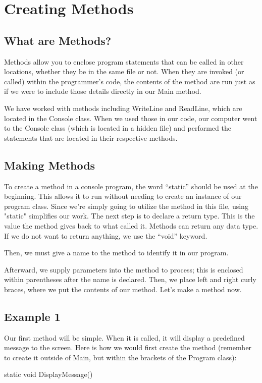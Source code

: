 \documentclass[oneside, openany] {book}
\begin{document}
\chapter{Creating Methods}
\minitoc
\section{What are Methods?}

Methods allow you to enclose program statements that can be called in other locations, whether they be in the same file or not. When they are invoked (or called) within the programmer’s code, the contents of the method are run just as if we were to include those details directly in our Main method.

We have worked with methods including WriteLine and ReadLine, which are located in the Console class. When we used those in our code, our computer went to the Console class (which is located in a hidden file) and performed the statements that are located in their respective methods.

\section{Making Methods}
To create a method in a console program, the word “static” should be used at the beginning. This allows it to run without needing to create an instance of our program class. Since we're simply going to utilize the method in this file, using "static" simplifies our work.
The next step is to declare a return type. This is the value the method gives back to what called it. Methods can return any data type. If we do not want to return anything, we use the “void” keyword. 

Then, we must give a name to the method to identify it in our program.

Afterward, we supply parameters into the method to process; this is enclosed within parentheses after the name is declared.
Then, we place left and right curly braces, where we put the contents of our method.
Let’s make a method now.

\section*{Example 1}
Our first method will be simple. When it is called, it will display a predefined message to the screen.
Here is how we would first create the method (remember to create it outside of Main, but within the brackets of the Program class):
\begin{CSharp}
static void DisplayMessage()
{
       
} 
\end{CSharp}
\end{document}
